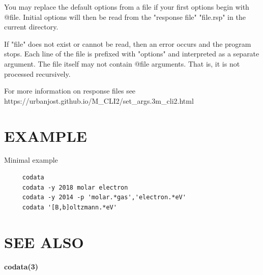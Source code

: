 You may replace the default options from a file if your first options
begin with @file. Initial options will then be read from the "response
file" "file.rsp" in the current directory.

If "file" does not exist or cannot be read, then an error occurs and the
program stops. Each line of the file is prefixed with "options" and
interpreted as a separate argument. The file itself may not contain
@file arguments. That is, it is not processed recursively.

For more information on response files see
https://urbanjost.github.io/M\_CLI2/set\_args.3m\_cli2.html

\section{EXAMPLE}

Minimal example

\begin{verbatim}
     codata
     codata -y 2018 molar electron
     codata -y 2014 -p 'molar.*gas','electron.*eV'
     codata '[B,b]oltzmann.*eV'
\end{verbatim}

\section{SEE ALSO}

\textbf{codata(3)}
